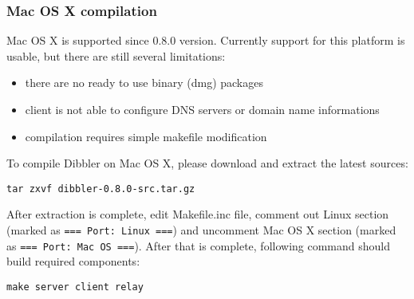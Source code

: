 \subsubsection{Mac OS X compilation}
\label{compile-macos}
Mac OS X is supported since 0.8.0 version. Currently support for this
platform is usable, but there are still several limitations:
\begin{itemize}
\item there are no ready to use binary (dmg) packages
\item client is not able to configure DNS servers or domain name
  informations
\item compilation requires simple makefile modification
\end{itemize}

To compile Dibbler on Mac OS X, please download and extract the latest
sources:
\begin{verbatim}
tar zxvf dibbler-0.8.0-src.tar.gz
\end{verbatim}
After extraction is complete, edit Makefile.inc file, comment out
Linux section (marked as \verb+=== Port: Linux ===+)
and uncomment Mac OS X section (marked as
\verb+=== Port: Mac OS ===+). After that is complete, following
command should build required components:

\begin{verbatim}
make server client relay
\end{verbatim}
